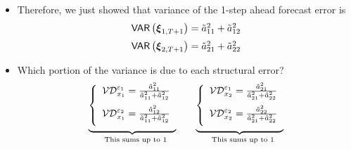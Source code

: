 \documentclass[10pt,handout]{beamer}
\begin{document}
\everymath\expandafter{\the\everymath \color{title!80}}
\everydisplay\expandafter{\the\everydisplay \color{title!80}}%

\vspace{0.1cm}

\begin{frame}
\begin{itemize}
\item Therefore, we just showed that variance of the 1-step ahead forecast
error is 
\begin{equation*}
\begin{array}{c}
\mathsf{VAR}\left( \mathbf{\xi }_{1,T+1}\right) =\tilde{a}_{11}^{2}+\tilde{a}%
_{12}^{2}\medskip \\ 
\mathsf{VAR}\left( \mathbf{\xi }_{2,T+1}\right) =\tilde{a}_{21}^{2}+\tilde{a}%
_{22}^{2}%
\end{array}%
\end{equation*}

\item Which portion of the variance is due to each structural error?%
\begin{equation*}
\underset{\text{This sums up to 1}}{\underbrace{\left\{ 
\begin{array}{c}
\mathcal{VD}_{x_{1}}^{\varepsilon _{1}}=\frac{\tilde{a}_{11}^{2}}{\tilde{a}%
_{11}^{2}+\tilde{a}_{12}^{2}}\medskip \\ 
\mathcal{VD}_{x_{1}}^{\varepsilon _{2}}=\frac{\tilde{a}_{12}^{2}}{\tilde{a}%
_{11}^{2}+\tilde{a}_{12}^{2}}\medskip%
\end{array}%
\right. }}\ \ \ \ \ \ \underset{\text{This sums up to 1}}{\underbrace{%
\left\{ 
\begin{array}{c}
\mathcal{VD}_{x_{2}}^{\varepsilon _{1}}=\frac{\tilde{a}_{21}^{2}}{\tilde{a}%
_{21}^{2}+\tilde{a}_{22}^{2}}\medskip \\ 
\mathcal{VD}_{x_{2}}^{\varepsilon _{2}}=\frac{\tilde{a}_{22}^{2}}{\tilde{a}%
_{21}^{2}+\tilde{a}_{22}^{2}}\medskip%
\end{array}%
\right. }}
\end{equation*}
\end{itemize}
\end{frame}
\end{document}
